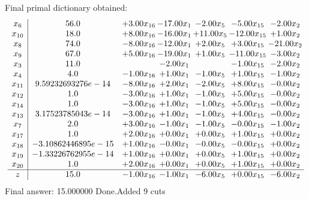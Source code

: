 \documentclass[8pt]{article}
\begin{document}
 Final primal dictionary obtained: 
\[\begin{array}{c| c c@{\hskip 2pt} c@{\hskip 2pt} c@{\hskip 2pt} c@{\hskip 2pt} c@{\hskip 2pt} }
 x_{6}   &  56.0 & +  3.00 x_{16} & -17.00 x_{1} & -2.00 x_{5} & -5.00 x_{15} & -2.00 x_{2}\\
 x_{10}   &  18.0 & +  8.00 x_{16} & -16.00 x_{1} & + 11.00 x_{5} & -12.00 x_{15} & +  1.00 x_{2}\\
 x_{8}   &  74.0 & -8.00 x_{16} & -12.00 x_{1} & +  2.00 x_{5} & +  3.00 x_{15} & -21.00 x_{2}\\
 x_{9}   &  67.0 & +  5.00 x_{16} & -19.00 x_{1} & +  1.00 x_{5} & -11.00 x_{15} & -3.00 x_{2}\\
 x_{3}   &  11.0  &   & -2.00 x_{1} &   & -1.00 x_{15} & -2.00 x_{2}\\
 x_{4}   &  4.0 & -1.00 x_{16} & +  1.00 x_{1} & -1.00 x_{5} & +  1.00 x_{15} & -1.00 x_{2}\\
 x_{11}   &  9.59232693276e-14 & -8.00 x_{16} & +  2.00 x_{1} & -2.00 x_{5} & +  8.00 x_{15} & -0.00 x_{2}\\
 x_{12}   &  1.0 & -3.00 x_{16} & +  1.00 x_{1} & -1.00 x_{5} & +  5.00 x_{15} & -0.00 x_{2}\\
 x_{14}   &  1.0 & -3.00 x_{16} & +  1.00 x_{1} & -1.00 x_{5} & +  5.00 x_{15} & -0.00 x_{2}\\
 x_{13}   &  3.17523785043e-14 & -3.00 x_{16} & +  1.00 x_{1} & -1.00 x_{5} & +  4.00 x_{15} & -0.00 x_{2}\\
 x_{7}   &  2.0 & +  3.00 x_{16} & -1.00 x_{1} & -1.00 x_{5} & -0.00 x_{15} & -1.00 x_{2}\\
 x_{17}   &  1.0 & +  2.00 x_{16} & +  0.00 x_{1} & +  0.00 x_{5} & +  1.00 x_{15} & +  0.00 x_{2}\\
 x_{18}   &  -3.10862446895e-15 & +  1.00 x_{16} & -0.00 x_{1} & -0.00 x_{5} & -0.00 x_{15} & +  0.00 x_{2}\\
 x_{19}   &  -1.33226762955e-14 & +  1.00 x_{16} & +  0.00 x_{1} & +  0.00 x_{5} & +  1.00 x_{15} & +  0.00 x_{2}\\
 x_{20}   &  1.0 & +  2.00 x_{16} & +  0.00 x_{1} & +  0.00 x_{5} & +  1.00 x_{15} & +  0.00 x_{2}\\
\hline
z    &  15.0 & -1.00 x_{16} & -1.00 x_{1} & -6.00 x_{5} & +  0.00 x_{15} & -6.00 x_{2}\\
\end{array}\]
 Final answer: 15.000000 
Done.Added 9 cuts 
\end{document}
